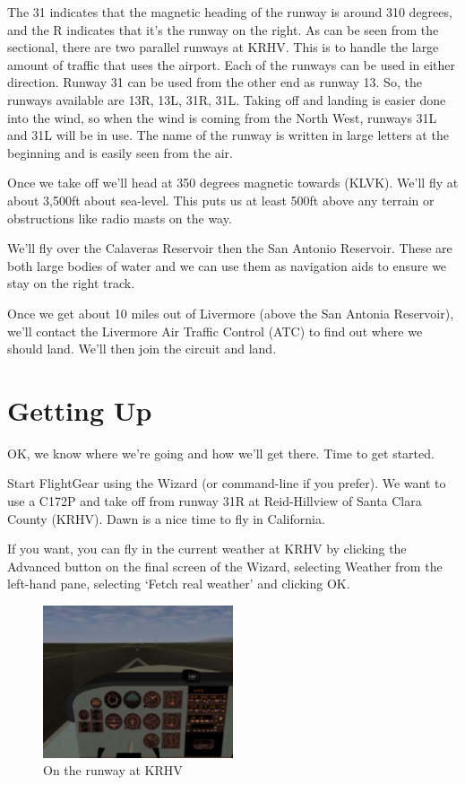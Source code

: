 The 31 indicates that the magnetic heading of the runway is around 310 degrees,
and the R indicates that it's the runway on the right. As can be seen from the
sectional, there are two parallel runways at KRHV. This is to handle the large
amount of traffic that uses the airport. Each of the runways can be used in
either direction. Runway 31 can be used from the other end as runway 13.
So, the runways available are 13R, 13L, 31R, 31L. Taking off and landing
is easier done into the wind, so when the wind is coming from the North West,
runways 31L and 31L will be in use. The name of the runway is written in large
letters at the beginning and is easily seen from the air.

Once we take off we'll head at 350 degrees magnetic towards  (KLVK).
We'll fly at about 3,500ft about sea-level. This puts us at least 500ft above any
terrain or obstructions like radio masts on the way.

We'll fly over the Calaveras Reservoir then the San Antonio Reservoir. These are
both large bodies of water and we can use them as navigation aids to ensure we
stay on the right track.

Once we get about 10 miles out of Livermore (above the San Antonia Reservoir),
we'll contact the Livermore Air Traffic Control (ATC) to find out
where we should land. We'll then join the circuit and land.

\section{Getting Up}

OK, we know where we're going and how we'll get there. Time to get started.

Start FlightGear using the Wizard (or command-line if you prefer).
 We want to use a C172P and take off from runway 31R at Reid-Hillview of
 Santa Clara County (KRHV). Dawn is a nice time to fly in California.

If you want, you can fly in the current weather at KRHV by clicking the
Advanced button on the final screen of the Wizard, selecting Weather
from the left-hand pane, selecting `Fetch real weather' and clicking OK.

\begin{figure}[!htp]
\centering
\includegraphics[width=0.5\textwidth]{krhvrunway}
\caption{On the runway at KRHV}
\end{figure}

